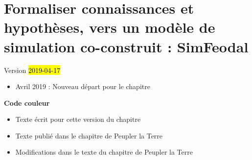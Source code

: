 \chapter{Formaliser connaissances et hypothèses, vers un modèle de simulation co-construit : SimFeodal}
\label{chap:chap2}
\begin{center}
	{\large Version \hl{2019-04-17}}
\end{center}

\begin{itemize}
	\item Avril 2019 : Nouveau départ pour le chapitre
\end{itemize}
\setcounter{minitocdepth}{1}

	\minitoc


\textbf{Code couleur}
\begin{itemize}
	\item Texte écrit pour cette version du chapitre
	\item {\redroman Texte publié dans le chapitre de Peupler la Terre}
	\item {\blueroman Modifications dans le texte du chapitre de Peupler la Terre}
\end{itemize}

\clearpage


